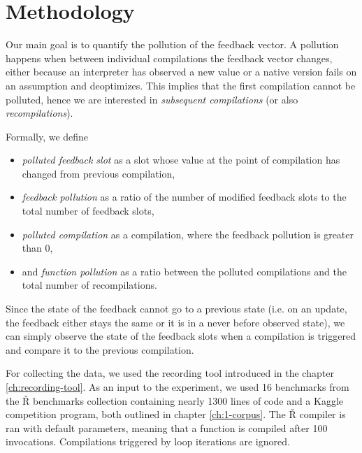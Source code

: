 \section{Methodology}

Our main goal is to quantify the pollution of the feedback vector. A pollution happens when between individual compilations the feedback vector changes, either because an interpreter has observed a new value or a native version fails on an assumption and deoptimizes. This implies that the first compilation cannot be polluted, hence we are interested in \textit{subsequent compilations} (or also \textit{recompilations}).

Formally, we define
\begin{itemize}
	\item{} \textit{polluted feedback slot} as a slot whose value at the point of compilation has changed from previous compilation,
	\item{} \textit{feedback pollution} as a ratio of the number of modified feedback slots to the total number of feedback slots,
	\item{} \textit{polluted compilation} as a compilation, where the feedback pollution is greater than 0,
	\item{} and \textit{function pollution} as a ratio between the polluted compilations and the total number of recompilations.
\end{itemize}


Since the state of the feedback cannot go to a previous state (i.e. on an update, the feedback either stays the same or it is in a never before observed state), we can simply observe the state of the feedback slots when a compilation is triggered and compare it to the previous compilation.

For collecting the data, we used the recording tool introduced in the chapter \ref{ch:recording-tool}. As an input to the experiment, we used 16 benchmarks from the Ř benchmarks collection containing nearly 1300 lines of code and a Kaggle competition program, both outlined in chapter \ref{ch:1-corpus}. The Ř compiler is ran with default parameters, meaning that a function is compiled after 100 invocations. Compilations triggered by loop iterations are ignored.

